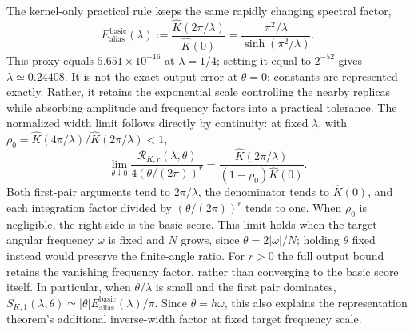 \documentclass[11pt]{article}
\begin{document}
The kernel-only practical rule keeps the same rapidly changing spectral
factor,
\begin{equation}
 E_{\mathrm{alias}}^{\mathrm{basic}}(\lambda)
 :=\frac{\widehat K(2\pi/\lambda)}{\widehat K(0)}
 =\frac{\pi^2/\lambda}{\sinh(\pi^2/\lambda)}.
 \label{eq:lambda-basic-appendix}
\end{equation}
This proxy equals $5.651\times10^{-16}$ at $\lambda=1/4$; setting it
equal to $2^{-52}$ gives $\lambda\simeq0.24408$.
It is not the exact output error at $\theta=0$: constants are represented
exactly. Rather, it retains the exponential scale controlling the nearby
replicas while absorbing amplitude and frequency factors into a practical
tolerance. The normalized width limit follows directly by continuity:
at fixed $\lambda$, with
$\rho_0=\widehat K(4\pi/\lambda)/\widehat K(2\pi/\lambda)<1$,
\begin{equation}
 \lim_{\theta\downarrow0}
 \frac{\mathcal R_{K,r}(\lambda,\theta)}{4(\theta/(2\pi))^r}
 =\frac{\widehat K(2\pi/\lambda)}{(1-\rho_0)\widehat K(0)}.
 \label{eq:lambda-zero-angle-limit}
\end{equation}
Both first-pair arguments tend to $2\pi/\lambda$, the denominator tends
to $\widehat K(0)$, and each integration factor divided by $(\theta/(2\pi))^r$
tends to one. When $\rho_0$ is negligible, the right side is the basic
score. This limit holds when the target angular frequency $\omega$ is
fixed and $N$ grows, since $\theta=2|\omega|/N$; holding $\theta$ fixed
instead would preserve the finite-angle ratio. For $r>0$ the full output
bound retains the vanishing frequency factor, rather than converging to
the basic score itself. In particular, when $\theta/\lambda$ is small and the first pair dominates,
$S_{K,1}(\lambda,\theta)\simeq
|\theta|E_{\mathrm{alias}}^{\mathrm{basic}}(\lambda)/\pi$.
Since $\theta=h\omega$, this also explains the representation theorem's
additional inverse-width factor at fixed target frequency scale.
\end{document}
